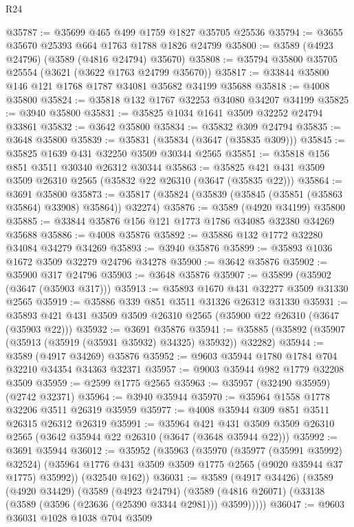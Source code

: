 \begin{lexlean}{R24}
\begin{coremodule}
@35787 := @35699 @465 @499 @1759 @1827 @35705 @25536
@35794 := @3655 @35670 @25393 @664 @1763 @1788 @1826 @24799
@35800 := @3589 (@4923 @24796) (@3589 (@4816 @24794) @35670)
@35808 := @35794 @35800 @35705 @25554 (@3621 (@3622 @1763 @24799 @35670))
@35817 := @33844 @35800 @146 @121 @1768 @1787 @34081 @35682 @34199 @35688
@35818 := @4008 @35800
@35824 := @35818 @132 @1767 @32253 @34080 @34207 @34199
@35825 := @3940 @35800
@35831 := @35825 @1034 @1641 @3509 @32252 @24794 @33861
@35832 := @3642 @35800
@35834 := @35832 @309 @24794
@35835 := @3648 @35800
@35839 := @35831 (@35834 (@3647 (@35835 @309)))
@35845 := @35825 @1639 @431 @32250 @3509 @30344 @2565
@35851 := @35818 @156 @851 @3511 @30340 @26312 @30344
@35863 := @35825 @421 @431 @3509 @3509 @26310 @2565 (@35832 @22 @26310 (@3647 (@35835 @22)))
@35864 := @3691 @35800
@35873 := @35817 (@35824 (@35839 (@35845 (@35851 (@35863 @35864) @33908) @35864)) @32274)
@35876 := @3589 (@4920 @34199) @35800
@35885 := @33844 @35876 @156 @121 @1773 @1786 @34085 @32380 @34269 @35688
@35886 := @4008 @35876
@35892 := @35886 @132 @1772 @32280 @34084 @34279 @34269
@35893 := @3940 @35876
@35899 := @35893 @1036 @1672 @3509 @32279 @24796 @34278
@35900 := @3642 @35876
@35902 := @35900 @317 @24796
@35903 := @3648 @35876
@35907 := @35899 (@35902 (@3647 (@35903 @317)))
@35913 := @35893 @1670 @431 @32277 @3509 @31330 @2565
@35919 := @35886 @339 @851 @3511 @31326 @26312 @31330
@35931 := @35893 @421 @431 @3509 @3509 @26310 @2565 (@35900 @22 @26310 (@3647 (@35903 @22)))
@35932 := @3691 @35876
@35941 := @35885 (@35892 (@35907 (@35913 (@35919 (@35931 @35932) @34325) @35932)) @32282)
@35944 := @3589 (@4917 @34269) @35876
@35952 := @9603 @35944 @1780 @1784 @704 @32210 @34354 @34363 @32371
@35957 := @9003 @35944 @982 @1779 @32208 @3509
@35959 := @2599 @1775 @2565
@35963 := @35957 (@32490 @35959) (@2742 @32371)
@35964 := @3940 @35944
@35970 := @35964 @1558 @1778 @32206 @3511 @26319 @35959
@35977 := @4008 @35944 @309 @851 @3511 @26315 @26312 @26319
@35991 := @35964
    @421
    @431
    @3509
    @3509
    @26310
    @2565
    (@3642 @35944 @22 @26310 (@3647 (@3648 @35944 @22)))
@35992 := @3691 @35944
@36012 := @35952
    (@35963
      (@35970
        (@35977 (@35991 @35992) @32524)
        (@35964 @1776 @431 @3509 @3509 @1775 @2565 (@9020 @35944 @37 @1775) @35992))
      (@32540 @162))
@36031 := @3589
    (@4917 @34426)
    (@3589
      (@4920 @34429)
      (@3589
        (@4923 @24794)
        (@3589 (@4816 @26071) (@33138 (@3589 (@3596 (@23636 (@25390 @3344 @2981))) @3599)))))
@36047 := @9603
    @36031
    @1028
    @1038
    @704
    @3509

\end{coremodule}
\end{lexlean}
